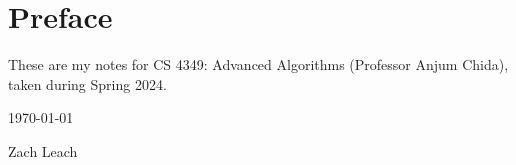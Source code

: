 \chapter*{Preface}

These are my notes for CS 4349: Advanced Algorithms (Professor Anjum Chida), taken during Spring 2024.

\vspace{12pt}
\hfill \today 

\hfill Zach Leach


